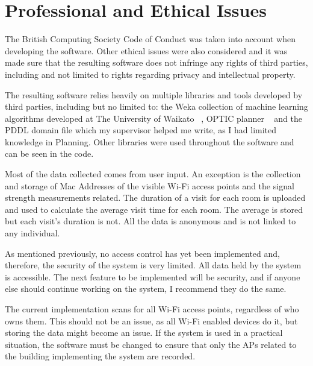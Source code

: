 \chapter{Professional and Ethical Issues}
The British Computing Society Code of Conduct was taken into account when developing the software. Other ethical issues were also considered and it was made sure that the resulting software does not infringe any rights of third parties, including and not limited to rights regarding privacy and intellectual property. 

The resulting software relies heavily on multiple libraries and tools developed by third parties, including but no limited to: the Weka collection of machine learning algorithms developed at The University of Waikato ~\cite{Weka}, OPTIC planner ~\cite{OPTIC} and the PDDL domain file which my supervisor helped me write, as I had limited knowledge in Planning. Other libraries were used throughout the software and can be seen in the code. 

Most of the data collected comes from user input. An exception is the collection and storage of Mac Addresses of the visible Wi-Fi access points and the signal strength measurements related. The duration of a visit for each room is uploaded and used to calculate the average visit time for each room. The average is stored but each visit's duration is not. All the data is anonymous and is not linked to any individual. 

As mentioned previously, no access control has yet been implemented and, therefore, the security of the system is very limited. All data held by the system is accessible. The next feature to be implemented will be security, and if anyone else should continue working on the system, I recommend they do the same.

The current implementation scans for all Wi-Fi access points, regardless of who owns them. This should not be an issue, as all Wi-Fi enabled devices do it, but storing the data might become an issue. If the system is used in a practical situation, the software must be changed to ensure that only the APs related to the building implementing the system are recorded.